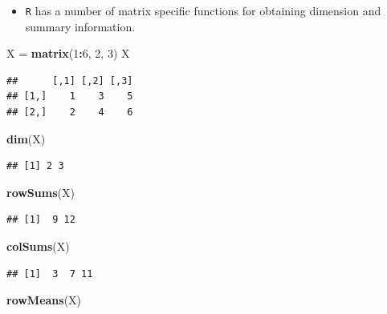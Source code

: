 \documentclass[]{book}
\newenvironment{Shaded}{\begin{snugshade}}{\end{snugshade}}
\newcommand{\KeywordTok}[1]{\textcolor[rgb]{0.13,0.29,0.53}{\textbf{#1}}}
\newcommand{\DecValTok}[1]{\textcolor[rgb]{0.00,0.00,0.81}{#1}}
\newcommand{\StringTok}[1]{\textcolor[rgb]{0.31,0.60,0.02}{#1}}
\newcommand{\OperatorTok}[1]{\textcolor[rgb]{0.81,0.36,0.00}{\textbf{#1}}}
\newcommand{\NormalTok}[1]{#1}
\providecommand{\tightlist}{%
  \setlength{\itemsep}{0pt}\setlength{\parskip}{0pt}}
\begin{document}
\begin{itemize}
\tightlist
\item
  \texttt{R} has a number of matrix specific functions for obtaining
  dimension and summary information.
\end{itemize}

\begin{Shaded}
\begin{Highlighting}[]
\NormalTok{X =}\StringTok{ }\KeywordTok{matrix}\NormalTok{(}\DecValTok{1}\OperatorTok{:}\DecValTok{6}\NormalTok{, }\DecValTok{2}\NormalTok{, }\DecValTok{3}\NormalTok{)}
\NormalTok{X}
\end{Highlighting}
\end{Shaded}

\begin{verbatim}
##      [,1] [,2] [,3]
## [1,]    1    3    5
## [2,]    2    4    6
\end{verbatim}

\begin{Shaded}
\begin{Highlighting}[]
\KeywordTok{dim}\NormalTok{(X)}
\end{Highlighting}
\end{Shaded}

\begin{verbatim}
## [1] 2 3
\end{verbatim}

\begin{Shaded}
\begin{Highlighting}[]
\KeywordTok{rowSums}\NormalTok{(X)}
\end{Highlighting}
\end{Shaded}

\begin{verbatim}
## [1]  9 12
\end{verbatim}

\begin{Shaded}
\begin{Highlighting}[]
\KeywordTok{colSums}\NormalTok{(X)}
\end{Highlighting}
\end{Shaded}

\begin{verbatim}
## [1]  3  7 11
\end{verbatim}

\begin{Shaded}
\begin{Highlighting}[]
\KeywordTok{rowMeans}\NormalTok{(X)}
\end{Highlighting}
\end{Shaded}
\end{document}
